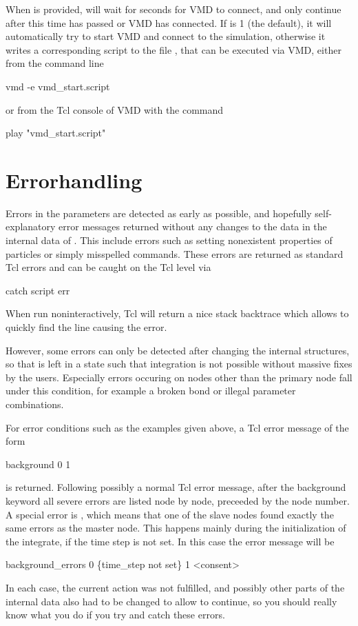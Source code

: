 When  is provided, \es will wait for  seconds for
VMD to connect, and only continue after this time has passed or VMD
has connected. If  is 1 (the default), it will
automatically try to start VMD and connect to the \es simulation,
otherwise it writes a corresponding script to the file
, that can be executed via VMD,
either from the command line
\begin{code}
  vmd -e vmd_start.script
\end{code}
or from the Tcl console of VMD with the command
\begin{code}
  play "vmd\_start.script"
\end{code}

\section{Errorhandling}
Errors in the parameters are detected as early as possible, and
hopefully self-explanatory error messages returned without any changes
to the data in the internal data of \es. This include errors such as
setting nonexistent properties of particles or simply misspelled
commands. These errors are returned as standard Tcl errors and can be
caught on the Tcl level via
\begin{tclcode}
catch {script} err 
\end{tclcode}
When run noninteractively, Tcl will return a nice stack backtrace
which allows to quickly find the line causing the error.

However, some errors can only be detected after changing the internal
structures, so that \es is left in a state such that integration is
not possible without massive fixes by the users. Especially errors
occuring on nodes other than the primary node fall under this
condition, for example a broken bond or illegal parameter
combinations.

For error conditions such as the examples given above, a Tcl error
message of the form
\begin{code}
 background 0   1 
\end{code}
is returned. Following possibly a normal Tcl error message, after the
background keyword all severe errors are listed node by node,
preceeded by the node number. A special error is ,
which means that one of the slave nodes found exactly the same errors
as the master node. This happens mainly during the initialization of
the integrate, \eg if the time step is not set. In this case the error
message will be
\begin{code}
background\_errors 0 \{time\_step not set\} 1 <consent> 
\end{code}
In each case, the current action was not fulfilled, and possibly other
parts of the internal data also had to be changed to allow \es to
continue, so you should really know what you do if you try and catch
these errors.


